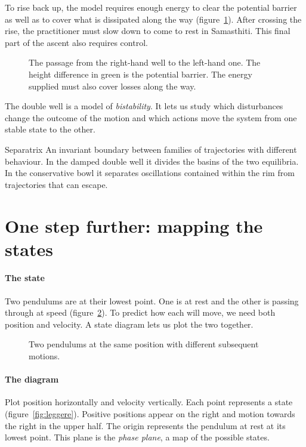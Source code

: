 To rise back up, the model requires enough energy to clear the potential barrier as well as to cover what is dissipated along the way (figure~\ref{fig:risalita}). After crossing the rise, the practitioner must slow down to come to rest in Samasthiti. This final part of the ascent also requires control.

\begin{figure}
\caption{The passage from the right-hand well to the left-hand one. The height difference in green is the potential barrier. The energy supplied must also cover losses along the way.}
\label{fig:risalita}
\end{figure}

The double well is a model of \emph{bistability}. It lets us study which disturbances change the outcome of the motion and which actions move the system from one stable state to the other.

\begin{parola}{Separatrix}
An invariant boundary between families of trajectories with different behaviour. In the damped double well it divides the basins of the two equilibria. In the conservative bowl it separates oscillations contained within the rim from trajectories that can escape.
\end{parola}

\section{One step further: mapping the states}\label{sec:mappa}

\paragraph{The state} Two pendulums are at their lowest point. One is at rest and the other is passing through at speed (figure~\ref{fig:velocita}). To predict how each will move, we need both position and velocity. A state diagram lets us plot the two together.

\begin{figure}
\caption{Two pendulums at the same position with different subsequent motions.}
\label{fig:velocita}
\end{figure}

\paragraph{The diagram} Plot position horizontally and velocity vertically. Each point represents a state (figure~\ref{fig:leggere}). Positive positions appear on the right and motion towards the right in the upper half. The origin represents the pendulum at rest at its lowest point. This plane is the \emph{phase plane}, a map of the possible states.

